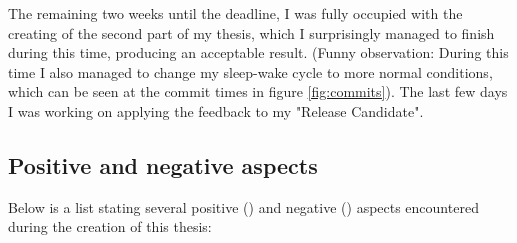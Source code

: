 The remaining two weeks until the deadline, I was fully occupied with the creating of the second part of my thesis, which I surprisingly managed to finish during this time, producing an acceptable result. (Funny observation: During this time I also managed to change my sleep-wake cycle to more normal conditions, which can be seen at the commit times in figure \ref{fig:commits}). The last few days I was working on applying the feedback to my "Release Candidate".


\subsection{Positive and negative aspects}

\def\positive{\ding{51}}
\def\negative{\ding{55}}

Below is a list stating several positive (\positive) and negative (\negative) aspects encountered during the creation of this thesis:

